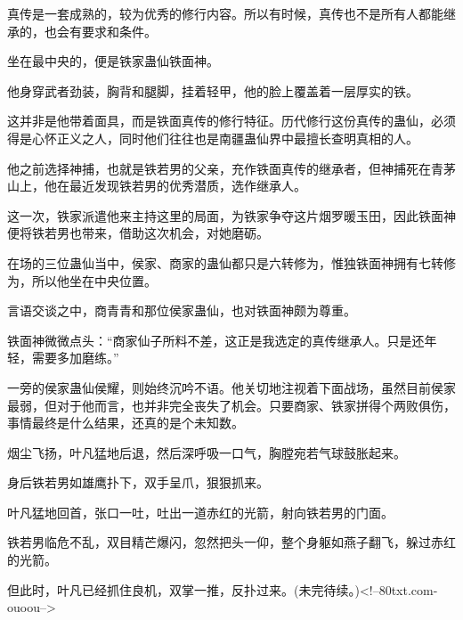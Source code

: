 \begin{this_body}
真传是一套成熟的，较为优秀的修行内容。所以有时候，真传也不是所有人都能继承的，也会有要求和条件。

坐在最中央的，便是铁家蛊仙铁面神。

他身穿武者劲装，胸背和腿脚，挂着轻甲，他的脸上覆盖着一层厚实的铁。

这并非是他带着面具，而是铁面真传的修行特征。历代修行这份真传的蛊仙，必须得是心怀正义之人，同时他们往往也是南疆蛊仙界中最擅长查明真相的人。

他之前选择神捕，也就是铁若男的父亲，充作铁面真传的继承者，但神捕死在青茅山上，他在最近发现铁若男的优秀潜质，选作继承人。

这一次，铁家派遣他来主持这里的局面，为铁家争夺这片烟罗暖玉田，因此铁面神便将铁若男也带来，借助这次机会，对她磨砺。

在场的三位蛊仙当中，侯家、商家的蛊仙都只是六转修为，惟独铁面神拥有七转修为，所以他坐在中央位置。

言语交谈之中，商青青和那位侯家蛊仙，也对铁面神颇为尊重。

铁面神微微点头：“商家仙子所料不差，这正是我选定的真传继承人。只是还年轻，需要多加磨练。”

一旁的侯家蛊仙侯耀，则始终沉吟不语。他关切地注视着下面战场，虽然目前侯家最弱，但对于他而言，也并非完全丧失了机会。只要商家、铁家拼得个两败俱伤，事情最终是什么结果，还真的是个未知数。

烟尘飞扬，叶凡猛地后退，然后深呼吸一口气，胸膛宛若气球鼓胀起来。

身后铁若男如雄鹰扑下，双手呈爪，狠狠抓来。

叶凡猛地回首，张口一吐，吐出一道赤红的光箭，射向铁若男的门面。

铁若男临危不乱，双目精芒爆闪，忽然把头一仰，整个身躯如燕子翻飞，躲过赤红的光箭。

但此时，叶凡已经抓住良机，双掌一推，反扑过来。(未完待续。)<!--80txt.com-ouoou-->

\end{this_body}

